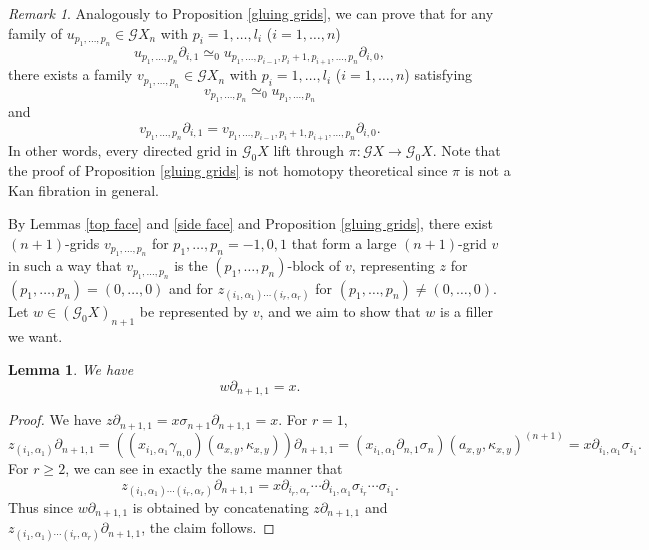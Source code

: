 \documentclass[oneside, 12pt]{amsart}
\numberwithin{equation}{section}
\theoremstyle{plain}
\newtheorem{lemma}[theorem]{Lemma}
\theoremstyle{definition}
\theoremstyle{remark}
\newtheorem{remark}[theorem]{Remark}
\begin{document}
	
	
	\begin{remark}
		Analogously to Proposition \ref{gluing grids}, we can prove that for any family of $u_{p_1,\ldots,p_n}\in\mathcal{G}X_n$ with $p_i=1,\ldots,l_i$ ($i=1,\ldots,n$)
		\[
		u_{p_1,\ldots,p_n}\partial_{i,1}\simeq_0u_{p_1,\ldots,p_{i-1},p_i+1,p_{i+1},\ldots,p_n}\partial_{i,0},
		\]
		there exists a family $v_{p_1,\ldots,p_n}\in\mathcal{G}X_n$ with $p_i=1,\ldots,l_i$ ($i=1,\ldots,n$) satisfying
		\[
		v_{p_1,\ldots,p_n}\simeq_0u_{p_1,\ldots,p_n}
		\]
		and
		\[
		v_{p_1,\ldots,p_n}\partial_{i,1}=v_{p_1,\ldots,p_{i-1},p_i+1,p_{i+1},\ldots,p_n}\partial_{i,0}.
		\]
		In other words, every directed grid in $\mathcal{G}_0X$ lift through $\pi\colon\mathcal{G}X\to\mathcal{G}_0X$. Note that the proof of Proposition \ref{gluing grids} is not homotopy theoretical since $\pi$ is not a Kan fibration in general.
	\end{remark}
	
	
	
	
	
	
	
	
	
	
	
	
	
	
	By Lemmas \ref{top face} and \ref{side face} and Proposition \ref{gluing grids}, there exist $(n+1)$-grids $v_{p_1,\ldots,p_n}$ for $p_1,\ldots,p_n=-1,0,1$ that form a large $(n+1)$-grid $v$ in such a way that $v_{p_1,\ldots,p_n}$ is the $(p_1,\ldots,p_n)$-block of $v$, representing $z$ for $(p_1,\ldots,p_n)=(0,\ldots,0)$ and for $z_{(i_1,\alpha_1)\cdots(i_r,\alpha_r)}$ for $(p_1,\ldots,p_n)\ne(0,\ldots,0)$. Let $w\in(\mathcal{G}_0X)_{n+1}$ be represented by $v$, and we aim to show that $w$ is a filler we want.
	
	
	
	
	\begin{lemma}
		\label{u top face}
		We have
		\[
		w\partial_{n+1,1}=x.
		\]
	\end{lemma}
	
	\begin{proof}
		We have $z\partial_{n+1,1}=x\sigma_{n+1}\partial_{n+1,1}=x$. For $r=1$,
		\[
		z_{(i_1,\alpha_1)}\partial_{n+1,1}=((x_{i_1,\alpha_1}\gamma_{n,0})(a_{x,y},\kappa_{x,y}))\partial_{n+1,1}=(x_{i_1,\alpha_1}\partial_{n,1}\sigma_n)(a_{x,y},\kappa_{x,y})^{(n+1)}=x\partial_{i_1,\alpha_1}\sigma_{i_1}.
		\]
		For $r\ge 2$, we can see in exactly the same manner that
		\[
		z_{(i_1,\alpha_1)\cdots(i_r,\alpha_r)}\partial_{n+1,1}=x\partial_{i_r,\alpha_r}\cdots\partial_{i_1,\alpha_1}\sigma_{i_r}\cdots\sigma_{i_1}.
		\]
		Thus since $w\partial_{n+1,1}$ is obtained by concatenating $z\partial_{n+1,1}$ and $z_{(i_1,\alpha_1)\cdots(i_r,\alpha_r)}\partial_{n+1,1}$, the claim follows.
	\end{proof}
	
\end{document}
